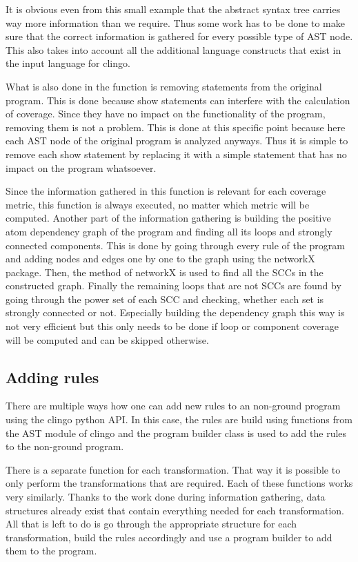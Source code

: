 It is obvious even from this small example that the abstract syntax tree carries way more information than we require. Thus some work has to be done to make sure that the correct information is gathered for every possible type of AST node. This also takes into account all the additional language constructs that exist in the input language for clingo.

What is also done in the  function is removing  statements from the original program. This is done because show statements can interfere with the calculation of coverage. Since they have no impact on the functionality of the program, removing them is not a problem. This is done at this specific point because here each AST node of the original program is analyzed anyways. Thus it is simple to remove each show statement by replacing it with a simple  statement that has no impact on the program whatsoever.

Since the information gathered in this function is relevant for each coverage metric, this function is always executed, no matter which metric will be computed. Another part of the information gathering is building the positive atom dependency graph of the program and finding all its loops and strongly connected components. This is done by going through every rule of the program and adding nodes and edges one by one to the graph using the networkX package. Then, the  method of networkX is used to find all the SCCs in the constructed graph. Finally the remaining loops that are not SCCs are found by going through the power set of each SCC and checking, whether each set is strongly connected or not. Especially building the dependency graph this way is not very efficient but this only needs to be done if loop or component coverage will be computed and can be skipped otherwise.

\subsection{Adding rules}
\label{subsec:Computing coverage metrics for propositional programs/Implementation details/Adding rules}
There are multiple ways how one can add new rules to an non-ground program using the clingo python API. In this case, the rules are build using functions from the AST module of clingo and the program builder class is used to add the rules to the non-ground program. 

There is a separate function for each transformation. That way it is possible to only perform the transformations that are required. Each of these functions works very similarly. Thanks to the work done during information gathering, data structures already exist that contain everything needed for each transformation. All that is left to do is go through the appropriate structure for each transformation, build the rules accordingly and use a program builder to add them to the program.


